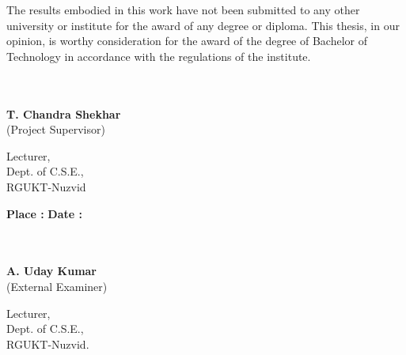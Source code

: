 \documentclass[12pt]{report}
\begin{document}
The results embodied in this work have not been submitted to any other university or institute for the award of any degree or diploma. This thesis, in our opinion, is worthy consideration for the award of the degree of Bachelor of Technology in accordance with the regulations of the institute.\\
\hfill\break
\hfill\break
\hfill\break
\hfill\break
\hfill\break
\hfill\break
\hfill\break


\begin{minipage}[t]{7cm}
\begin{flushleft}
\underline{\hspace{6cm}}\\
\underline{} \\
\textbf{T. Chandra Shekhar}\\
(Project Supervisor)\\
\begin{small}
Lecturer,\\
Dept. of C.S.E.,\\
RGUKT-Nuzvid\\
\end{small}
\hfill\break
\hfill\break
\hfill\break
\hfill\break
\hfill\break
\hfill\break
\vfill
\textbf{Place :} \underline{\hspace{5cm}}
\textbf{Date :} \underline{\hspace{5cm}}
\vfill
\end{flushleft}
\end{minipage}
\hfill
\begin{minipage}[t]{7cm}
\begin{flushright}
\underline{\hspace{6cm}}\\
\underline{} \\
\textbf{A. Uday Kumar}\\
(External Examiner)\\
\begin{small}
Lecturer,\\
Dept. of C.S.E.,\\
RGUKT-Nuzvid.\\
\end{small}



\end{flushright}


\end{minipage}

 \pagebreak
 
\end{document}
